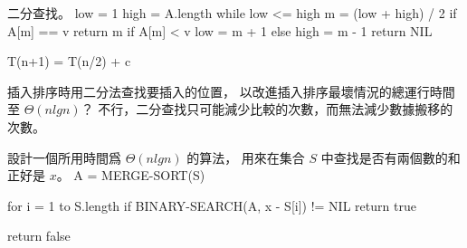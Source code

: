 二分查找。
\stopEXERCISE
\startANSWER
{}
\startCLRS
low = 1
high = A.length
while low <= high
	m = (low + high) / 2
	if A[m] == v
		return m
	if A[m] < v
		low = m + 1
	else
		high = m - 1
return NIL
\stopCLRS

\startformula
T(n+1) = T(n/2) + c
\stopformula
\stopANSWER

\startEXERCISE
插入排序時用二分法查找要插入的位置，
以改進插入排序最壞情況的總運行時間至 $\Theta(nlgn)$？
\stopEXERCISE
\startANSWER
不行，二分查找只可能減少比較的次數，而無法減少數據搬移的次數。
\stopANSWER

\startEXERCISE
設計一個所用時間爲 $\Theta(nlgn)$ 的算法，
用來在集合 $S$ 中查找是否有兩個數的和正好是 $x$。
\stopEXERCISE
\startANSWER
{}
\startCLRS
A = MERGE-SORT(S)

for i = 1 to S.length
	if BINARY-SEARCH(A, x - S[i]) != NIL
		return true

return false
\stopCLRS
\stopANSWER

\stopsection
